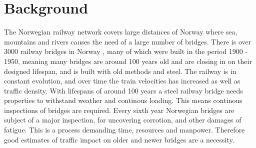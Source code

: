 \section{Background}
The Norwegian railway network covers large distances of Norway where sea, mountains and rivers causes the need of a large number of bridges. There is over 3000 railway bridges in Norway \cite{norsk_jernbane}, many of which were built in the period 1900 - 1950, meaning many bridges are around 100 years old and are closing in on their designed lifespan, and is built with old methods and steel. The railway is in constant evolution, and over time the train velocities has increased as well as traffic density. With lifespans of around 100 years a steel railway bridge needs properties to withstand weather and continous loading. This means continous inspections of bridges are required. Every sixth year Norwegian bridges are subject of a major inspection, for uncovering corrotion, and other damages of fatigue. This is a process demanding time, resources and manpower. Therefore good estimates of traffic impact on older and newer bridges are a necessity.

